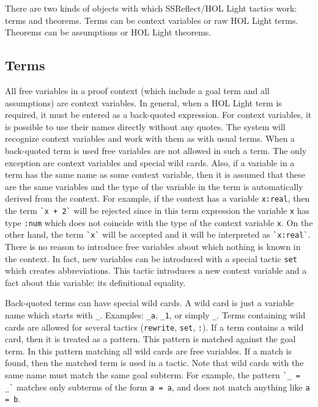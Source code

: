\documentclass[a4paper]{article}
\begin{document}
There are two kinds of objects with which SSReflect/HOL Light tactics work: terms and theorems. Terms can be context variables or raw HOL Light terms. Theorems can be assumptions or HOL Light theorems.

\subsection{Terms}
All free variables in a proof context (which include a goal term and all assumptions) are context variables. In general, when a HOL Light term is required, it must be entered as a back-quoted expression. For context variables, it is possible to use their names directly without any quotes. The system will recognize context variables and work with them as with usual terms. When a back-quoted term is used free variables are not allowed in such a term. The only exception are context variables and special wild cards. Also, if a variable in a term has the same name as some context variable, then it is assumed that these are the same variables and the type of the variable in the term is automatically derived from the context. For example, if the context has a variable \verb|x:real|, then the term \verb|`x + 2`| will be rejected since in this term expression the variable \verb|x| has type \verb|:num| which does not coincide with the type of the context variable \verb|x|. On the other hand, the term \verb|`x`| will be accepted and it will be interpreted as \verb|`x:real`|. There is no reason to introduce free variables about which nothing is known in the context. In fact, new variables can be introduced with a special tactic \verb|set| which creates abbreviations. This tactic introduces a new context variable and a fact about this variable: its definitional equality.

Back-quoted terms can have special wild cards. A wild card is just a variable name which starts with \verb|_|. Examples: \verb|_a|, \verb|_1|, or simply \verb|_|. Terms containing wild cards are allowed for several tactics (\verb|rewrite|, \verb|set|, \verb|:|). If a term contains a wild card, then it is treated as a pattern. This pattern is matched against the goal term. In this pattern matching all wild cards are free variables. If a match is found, then the matched term is used in a tactic. Note that wild cards with the same name must match the same goal subterm. For example, the pattern \verb|`_ = _`| matches only subterms of the form \verb|a = a|, and does not match anything like \verb|a = b|.
\end{document}
